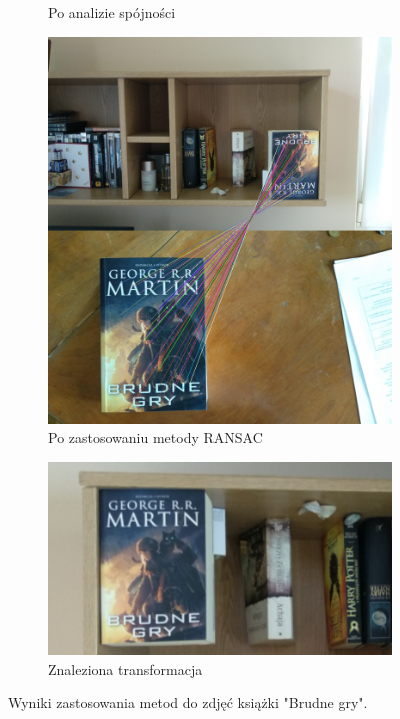 \documentclass{article}
\begin{document}
\begin{figure}[H]
\begin{subfigure}[b]{0.4\linewidth}
			\caption{Po analizie spójności}
		\end{subfigure}
		\begin{subfigure}[b]{0.4\linewidth}
			\includegraphics[width=\linewidth]{k2m.png}
			\caption{Po zastosowaniu metody RANSAC}
		\end{subfigure}
		\begin{subfigure}[b]{0.6\linewidth}
			\includegraphics[width=\linewidth]{k2t.png}
			\caption{Znaleziona transformacja}
		\end{subfigure}
		\caption{Wyniki zastosowania metod do zdjęć książki "Brudne gry".}
		\label{fig:w2}
	\end{figure}
\end{document}
